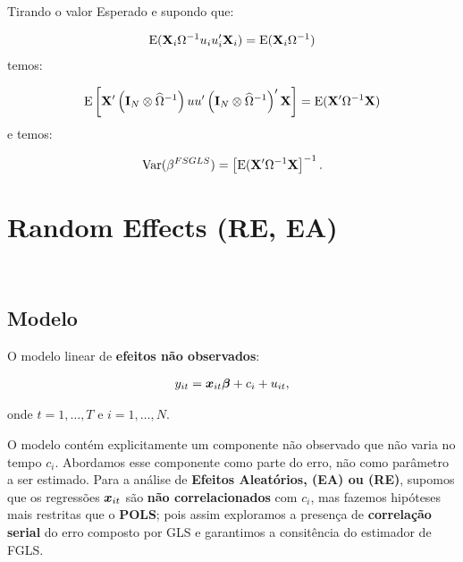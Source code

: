 \documentclass[11pt, oneside, a4paper, article]{article}
\numberwithin{equation}{section}
\begin{document}
\begin{description}
	Tirando o valor Esperado e supondo que:

	\vspace{-1.5 em}
	\begin{align*}
		\text{E}(\mathbf{X}_{i} \Omega^{-1} u_{i} u_{i}' \mathbf{X}_{i}) = \text{E}(\mathbf{X}_{i} \Omega^{-1})
	\end{align*}
	temos:

	\vspace{-1.5 em}
	\begin{align*}
		\text{E}\left[ \mathbf{X}' \left( \mathbf{I}_{N} \otimes \widehat{\Omega}^{-1} \right)
			u u'
		\left( \mathbf{I}_{N} \otimes \widehat{\Omega}^{-1} \right)' \mathbf{X} \right]
		=
		\text{E}(\mathbf{X}' \Omega^{-1} \mathbf{X})
	\end{align*}
	e temos:

	\vspace{-1.5 em}
	\begin{align*}
		\text{Var}(\beta^{FSGLS}) = \left[ \text{E}(\mathbf{X}' \Omega^{-1} \mathbf{X} \right]^{-1}.
		\end{align*}

		\clearpage
		\section{Random Effects (RE, EA)}
		\noindent
		\citet[Sec.10.4 -- Random Effects Methods, p.257]{wool-2010} \\

		\subsection{Modelo}

		O modelo linear de \textbf{efeitos não observados}:

		\vspace{-1 em}
		\begin{align} \label{mod1:EA}
			y_{it} = \boldsymbol{x}_{it} \boldsymbol{\beta} + c_{i} + u_{it},
		\end{align}

		\noindent
		onde
		$t = 1, \dots, T$ e $i = 1, \dots, N$.

		O modelo contém explicitamente um componente não observado que não varia no tempo $c_{i}$.
		Abordamos esse componente como parte do erro, não como parâmetro a ser estimado.
		Para a análise de \textbf{Efeitos Aleatórios, (EA) ou (RE)}, supomos que os regressões $\boldsymbol{x}_{it}$ são \textbf{não correlacionados} com $c_{i}$, mas fazemos hipóteses mais restritas que o \textbf{POLS}; pois assim exploramos a presença de \textbf{correlação serial} do erro composto por GLS e garantimos a consitência do estimador de FGLS.


\end{description}
\end{document}
